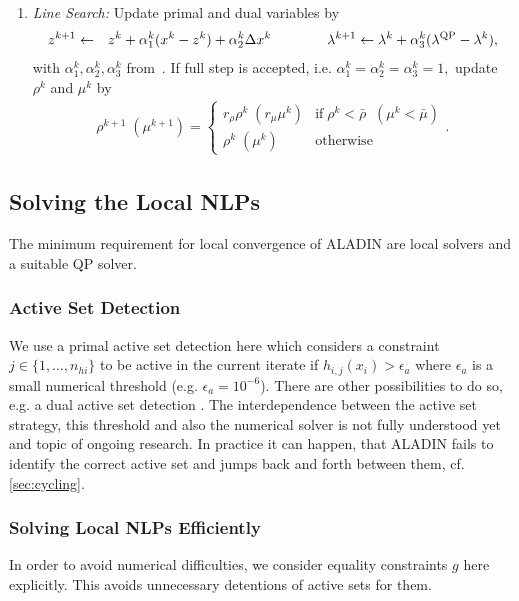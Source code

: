 \documentclass[]{scrartcl}
\begin{document}
\begin{algorithm}
\begin{enumerate}
		
		\item \textit{Line Search:} Update primal and dual variables by
		\begin{eqnarray}\notag
		z^{k+1}&\leftarrow&z^k + \alpha^k_1(x^k-z^k) + \alpha_2^k\Delta x^k \qquad \qquad
		\lambda^{k+1}\leftarrow\lambda^k + \alpha^k_3 (\lambda^\mathrm{QP}-\lambda^k),
		\end{eqnarray}
		with $\alpha^k_1,\alpha^k_2,\alpha^k_3$ from~\cite{Houska2016}. If full step 
		is accepted, i.e. $
		\alpha_1^k=\alpha_2^k=\alpha_3^k=1,
		$
		update $\rho^k$ and $\mu^k$ by
		\begin{align}
		\rho^{k+1}\;(\mu^{k+1}) =
		\begin{cases}
		r_\rho \rho^k\;(r_\mu \mu^k)   &\text{if} \; \rho^k < \bar \rho\;\; (\mu^k < \bar \mu)\\ \nonumber
		\rho^k\;(\mu^k)  &\text{otherwise} 
		\end{cases} .
		\end{align}
	\end{enumerate}
	\label{alg:ALADIN}
\end{algorithm}


\subsection{Solving the Local NLPs}
The minimum requirement for local convergence of ALADIN are local solvers and a suitable QP solver. 

\subsubsection{Active Set Detection}
We use a primal active set detection here which considers a constraint $j\in \{1,\dots,n_{hi}\}$ to be active in the current iterate if $h_{i,j}(x_i)>\epsilon_a$ where $\epsilon_a$ is a small numerical threshold (e.g. $\epsilon_a=10^{-6}$).
There are other possibilities to do so, e.g. a dual active set detection \cite{Nocedal}.
The interdependence between the active set strategy, this threshold and also the numerical solver is not fully understood yet and topic of ongoing research.
In practice it can happen, that ALADIN fails to identify the correct active set and jumps back and forth between them, cf. \autoref{sec:cycling}.

\subsubsection{Solving Local NLPs Efficiently}
In order to avoid numerical difficulties, we consider equality constraints $g$ here explicitly.
This avoids unnecessary detentions of active sets for them.
\end{document}
